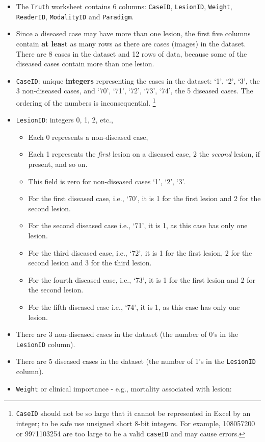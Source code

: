 \documentclass[
]{book}
\providecommand{\tightlist}{%
  \setlength{\itemsep}{0pt}\setlength{\parskip}{0pt}}
\begin{document}
\begin{itemize}
\tightlist
\item
  The \texttt{Truth} worksheet contains 6 columns: \texttt{CaseID}, \texttt{LesionID}, \texttt{Weight}, \texttt{ReaderID}, \texttt{ModalityID} and \texttt{Paradigm}.
\item
  Since a diseased case may have more than one lesion, the first five columns contain \textbf{at least} as many rows as there are cases (images) in the dataset. There are 8 cases in the dataset and 12 rows of data, because some of the diseased cases contain more than one lesion.
\item
  \texttt{CaseID}: unique \textbf{integers} representing the cases in the dataset: `1', `2', `3', the 3 non-diseased cases, and `70', `71', `72', `73', `74', the 5 diseased cases. The ordering of the numbers is inconsequential. \footnote{\texttt{CaseID} should not be so large that it cannot be represented in Excel by an integer; to be safe use unsigned short 8-bit integers. For example, 108057200 or 9971103254 are too large to be a valid \texttt{caseID} and may cause errors.}
\item
  \texttt{LesionID}: integers 0, 1, 2, etc.,

  \begin{itemize}
  \tightlist
  \item
    Each 0 represents a non-diseased case,
  \item
    Each 1 represents the \emph{first} lesion on a diseased case, 2 the \emph{second} lesion, if present, and so on.
  \item
    This field is zero for non-diseased cases `1', `2', `3'.
  \item
    For the first diseased case, i.e., `70', it is 1 for the first lesion and 2 for the second lesion.
  \item
    For the second diseased case i.e., `71', it is 1, as this case has only one lesion.
  \item
    For the third diseased case, i.e., `72', it is 1 for the first lesion, 2 for the second lesion and 3 for the third lesion.
  \item
    For the fourth diseased case, i.e., `73', it is 1 for the first lesion and 2 for the second lesion.
  \item
    For the fifth diseased case i.e., `74', it is 1, as this case has only one lesion.
  \end{itemize}
\item
  There are 3 non-diseased cases in the dataset (the number of 0's in the \texttt{LesionID} column).
\item
  There are 5 diseased cases in the dataset (the number of 1's in the \texttt{LesionID} column).
\item
  \texttt{Weight} or clinical importance - e.g., mortality associated with lesion:


\end{itemize}
\end{document}
